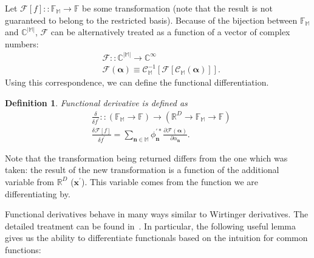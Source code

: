 \documentclass[12pt,aip,jmp,amssymb,amsmath]{revtex4-1}
\newtheorem{definition}{Definition}
\begin{document}
Let $\mathcal{F}[f] :: \mathbb{F}_{\mathbb{M}} \rightarrow \mathbb{F}$ be some transformation (note that the result is not guaranteed to belong to the restricted basis).
Because of the bijection between $\mathbb{F}_{\mathbb{M}}$ and $\mathbb{C}^{|\mathbb{M}|}$, $\mathcal{F}$ can be alternatively treated as a function of a vector of complex numbers:
\begin{equation}\begin{split}
    & \mathcal{F} :: \mathbb{C}^{|\mathbb{M}|} \rightarrow \mathbb{C}^\infty \\
    & \mathcal{F}(\boldsymbol{\alpha}) \equiv \mathcal{C}_{\mathbb{M}}^{-1}[\mathcal{F}[\mathcal{C}_{\mathbb{M}}(\boldsymbol{\alpha})]].
\end{split}\end{equation}
Using this correspondence, we can define the functional differentiation.

\begin{definition}
\label{def:func-calculus:func-diff}
    Functional derivative is defined as
    \begin{equation*}\begin{split}
        & \frac{\delta}{\delta f^\prime} ::
        \left(
            \mathbb{F}_{\mathbb{M}} \rightarrow \mathbb{F}
        \right)
        \rightarrow
        \left(
            \mathbb{R}^D \rightarrow \mathbb{F}_{\mathbb{M}} \rightarrow \mathbb{F}
        \right) \\
        & \frac{\delta \mathcal{F}[f]}{\delta f^\prime}
        = \sum_{\boldsymbol{n} \in \mathbb{M}} \phi_{\boldsymbol{n}}^{\prime*}
            \frac{\partial \mathcal{F}(\boldsymbol{\alpha})}{\partial \alpha_{\boldsymbol{n}}}.
    \end{split}\end{equation*}
\end{definition}

Note that the transformation being returned differs from the one which was taken: the result of the new transformation is a function of the additional variable from $\mathbb{R}^D$ ($\boldsymbol{x}^\prime$).
This variable comes from the function we are differentiating by.

Functional derivatives behave in many ways similar to Wirtinger derivatives.
The detailed treatment can be found in~\cite{Dalton2011}.
In particular, the following useful lemma gives us the ability to differentiate functionals based on the intuition for common functions:
\end{document}
